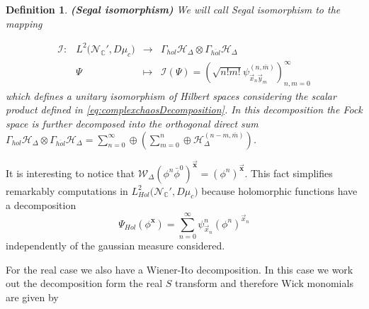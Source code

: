\documentclass[12pt]{article}%
\newtheorem{definition}{Definition}%
\begin{document}
\begin{definition}
    \label{def:SegalIso}{\bf (Segal isomorphism)} 
    We will call Segal isomorphism to the mapping


    \begin{equation}
\label{eq:Segal}
\begin{array}{cccc}
    \mathcal{I} :&  L^2\big({\mathcal{N}_{\mathbb{C}}'}, D\mu_c\big) & \longrightarrow &  \Gamma_{hol}\mathcal{H}_\Delta\otimes \Gamma_{\overline{hol}}\mathcal{H}_\Delta
 \\ 
 &  \Psi &\longmapsto &  \mathcal{I}(\Psi)=\left (\sqrt{n!m!}\psi^{(n,\bar{m})}_{\vec x_n \vec y_m} \right )_{n,m=0}^\infty 
\end{array}
\end{equation}
which defines a unitary isomorphism of Hilbert spaces considering the scalar product defined in \eqref{eq:complexchaosDecomposition}. In this decomposition the Fock space is further decomposed into the orthogonal direct sum $\Gamma_{hol}\mathcal{H}_\Delta\otimes \Gamma_{\overline{hol}}\mathcal{H}_\Delta
=\sum_{n=0}^\infty\oplus \left( \sum_{m=0}^n\oplus \mathcal{H}_\Delta^{(n-m,\bar{m})} \right)$.
\end{definition} 
    It is interesting to notice that  $\mathcal{W}_\Delta(\phi^n\bar{\phi}^0)^{\vec{\mathbf{x}}}= (\phi^n)^{\vec{\mathbf{x}}}$. This fact simplifies remarkably computations in $L^2_{Hol}\big({\mathcal{N}_{\mathbb{C}}'}, D\mu_c\big)$ because holomorphic functions have a decomposition 
    \begin{equation}
    \label{eq:holchaosdecomposition}
    \Psi_{Hol}(\phi^{\mathbf{x}})=\sum_{n=0}^\infty\psi^{n}_{\vec{x}_n}(\phi^n)^{\vec{x}_n}
    \end{equation}
     independently of the gaussian measure considered. 


    For the real case we also have a Wiener-Ito decomposition.  In this case we work out the decomposition form the real $S$ transform and therefore Wick monomials are given by 
\end{document}
